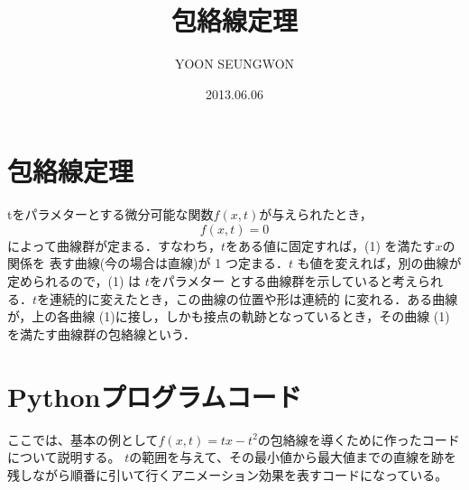 \documentclass[11pt,a4j,fleqn]{jarticle}
\title{包絡線定理}
\author{YOON SEUNGWON}
\date{2013.06.06}
\begin{document}
\maketitle

\section{包絡線定理}

tをパラメターとする微分可能な関数$f(x,t)$が与えられたとき，
\begin{equation}
f(x,t) = 0\label{eq:square-1}
\end{equation}
によって曲線群が定まる．すなわち，$t$をある値に固定すれば，(1) を満たす$x$の関係を
表す曲線(今の場合は直線)が 1 つ定まる．$t$ も値を変えれば，別の曲線が定められるので，(1) は $t$をパラメター
とする曲線群を示していると考えられる．$t$を連続的に変えたとき，この曲線の位置や形は連続的
に変れる．ある曲線が，上の各曲線 (1)に接し，しかも接点の軌跡となっているとき，その曲線
(1)を満たす曲線群の包絡線という．




\section{Pythonプログラムコード}
ここでは、基本の例として$f(x,t)=tx-t^2$の包絡線を導くために作ったコードについて説明する。
$t$の範囲を与えて、その最小値から最大値までの直線を跡を残しながら順番に引いて行くアニメーション効果を表すコードになっている。
\end{document}
